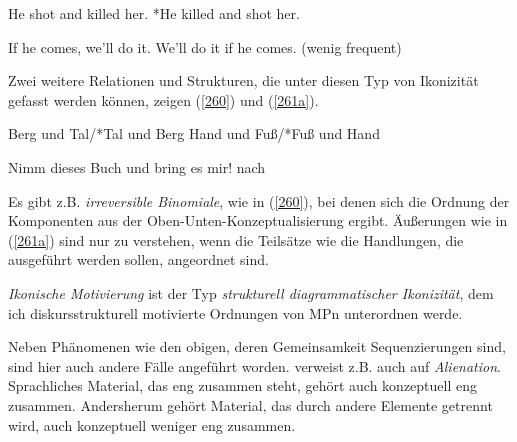 \begin{exe}
	\ex\label{258} 
		\begin{xlist}	
			\ex\label{258a} He shot and killed her.
			\ex\label{258b} *He killed and shot her.
			\hfill\hbox {\citet[92]{Givon1991}}
		\end{xlist}
\end{exe}

\begin{exe}
	\ex\label{259} 
		\begin{xlist}	
			\ex\label{259a} If he comes, we'll do it.
			\ex\label{259b} We'll do it if he comes. (wenig frequent)
			\hfill\hbox {\citet[93]{Givon1991}}
		\end{xlist}
\end{exe}
Zwei weitere Relationen und Strukturen, die unter diesen Typ von Ikonizität gefasst werden können, zeigen (\ref{260}) und (\ref{261a}).

\begin{exe}
	\ex\label{260} 
		\begin{xlist}	
			\ex\label{260a} Berg und Tal/*Tal und Berg
			\ex\label{260b} Hand und Fuß/*Fuß und Hand	
			\hfill\hbox {\citet[140-141]{Plank1979}}
		\end{xlist}
\end{exe}

\begin{exe}
	\ex\label{261a} 
		Nimm dieses Buch und bring es mir!
		\hfill\hbox {nach \citet[161]{Simone1995}}
\end{exe}
Es gibt z.B.  \textit{irreversible Binomiale}, wie in (\ref{260}), bei denen sich die Ordnung der Komponenten aus der Oben-Unten-Konzeptualisierung ergibt. Äußerungen wie in (\ref{261a}) sind nur zu verstehen, wenn die Teilsätze wie die Handlungen, die ausgeführt werden sollen, angeordnet sind.

\textit{Ikonische Motivierung}  ist der  Typ \textit{strukturell diagrammatischer Ikonizität}, dem ich diskursstrukturell motivierte Ordnungen von MPn unterordnen werde. 

Neben Phänomenen wie den obigen, deren Gemeinsamkeit Sequenzierungen sind, sind hier auch andere Fälle angeführt worden. \citet[191]{Haiman1992} verweist z.B. auch auf  \textit{Alienation}. Sprachliches Material, das eng zusammen steht, gehört auch konzeptuell eng zusammen. Andersherum gehört Material, das durch andere Elemente getrennt wird, auch konzeptuell weniger eng zusammen. 

